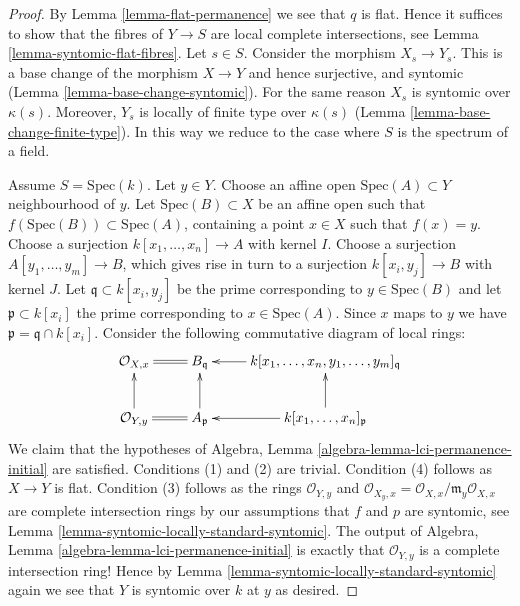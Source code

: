 \begin{proof}
By Lemma \ref{lemma-flat-permanence} we see that $q$ is flat.
Hence it suffices to show that the fibres of $Y \to S$ are
local complete intersections, see Lemma \ref{lemma-syntomic-flat-fibres}.
Let $s \in S$. Consider the morphism $X_s \to Y_s$.
This is a base change of the morphism $X \to Y$ and hence
surjective, and syntomic (Lemma \ref{lemma-base-change-syntomic}).
For the same reason $X_s$ is syntomic over $\kappa(s)$.
Moreover, $Y_s$ is locally of finite type over $\kappa(s)$
(Lemma \ref{lemma-base-change-finite-type}). In this way
we reduce to the case where $S$ is the spectrum of a field.

\medskip\noindent
Assume $S = \text{Spec}(k)$. Let $y \in Y$. Choose an affine
open $\text{Spec}(A) \subset Y$ neighbourhood of $y$. Let
$\text{Spec}(B) \subset X$ be an affine open such that
$f(\text{Spec}(B)) \subset \text{Spec}(A)$, containing
a point $x \in X$ such that $f(x) = y$. Choose a surjection
$k[x_1, \ldots, x_n] \to A$ with kernel $I$.
Choose a surjection $A[y_1, \ldots, y_m] \to B$, which gives
rise in turn to a surjection $k[x_i, y_j] \to B$ with kernel $J$.
Let $\mathfrak q \subset k[x_i, y_j]$ be the prime corresponding
to $y \in \text{Spec}(B)$ and let $\mathfrak p \subset k[x_i]$ the prime
corresponding to $x \in \text{Spec}(A)$.
Since $x$ maps to $y$ we have $\mathfrak p = \mathfrak q \cap k[x_i]$.
Consider the following commutative diagram of local rings:
$$
\xymatrix{
\mathcal{O}_{X, x} \ar@{=}[r] &
B_{\mathfrak q} &
k[x_1, \ldots, x_n, y_1, \ldots, y_m]_{\mathfrak q} \ar[l] \\
\mathcal{O}_{Y, y} \ar@{=}[r] \ar[u] & A_{\mathfrak p} \ar[u] &
k[x_1, \ldots, x_n]_{\mathfrak p} \ar[l] \ar[u]
}
$$
We claim that the hypotheses of
Algebra, Lemma \ref{algebra-lemma-lci-permanence-initial} are satisfied.
Conditions (1) and (2) are trivial. Condition (4) follows as
$X \to Y$ is flat. Condition (3) follows as the rings
$\mathcal{O}_{Y, y}$ and
$\mathcal{O}_{X_y, x} = \mathcal{O}_{X, x}/\mathfrak m_y\mathcal{O}_{X, x}$
are complete intersection rings by our assumptions that
$f$ and $p$ are syntomic, see
Lemma \ref{lemma-syntomic-locally-standard-syntomic}.
The output of Algebra, Lemma \ref{algebra-lemma-lci-permanence-initial}
is exactly that $\mathcal{O}_{Y, y}$ is a complete intersection
ring! Hence by Lemma \ref{lemma-syntomic-locally-standard-syntomic}
again we see that $Y$ is syntomic over $k$ at $y$ as desired.
\end{proof}









